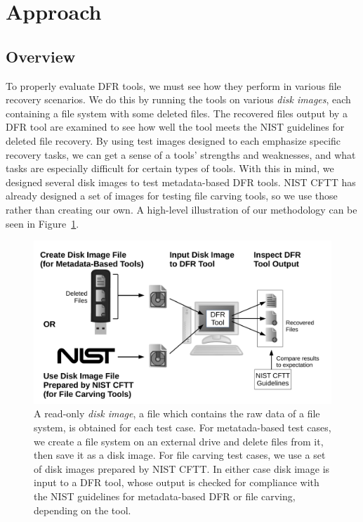 \section{Approach}
\subsection{Overview}

To properly evaluate DFR tools, we must see how they perform in various file recovery scenarios.
We do this by running the tools on various \emph{disk images}, each containing a file system with some deleted files.
The recovered files output by a DFR tool are examined to see how well the tool meets the NIST guidelines for deleted file recovery.
By using test images designed to each emphasize specific recovery tasks, we can get a sense of a tools' strengths and weaknesses, and what tasks are especially difficult for certain types of tools.
With this in mind, we designed several disk images to test metadata-based DFR tools.
NIST CFTT has already designed a set of images for testing file carving tools, so we use those rather than creating our own.
A high-level illustration of our methodology can be seen in Figure~\ref{fig:overview}.


\begin{figure}[h]
    \centering
    \includegraphics[width=\linewidth]{fig/overview.pdf}
    \caption{
        A read-only \emph{disk image}, a file which contains the raw data of a file system, is obtained for each test case.
        For metatada-based test cases, we create a file system on an external drive and delete files from it, then save it as a disk image.
        For file carving test cases, we use a set of disk images prepared by NIST CFTT.
        In either case disk image is input to a DFR tool, whose output is checked for compliance with the NIST guidelines for metadata-based DFR or file carving, depending on the tool.
    }
    \label{fig:overview}
\end{figure}

